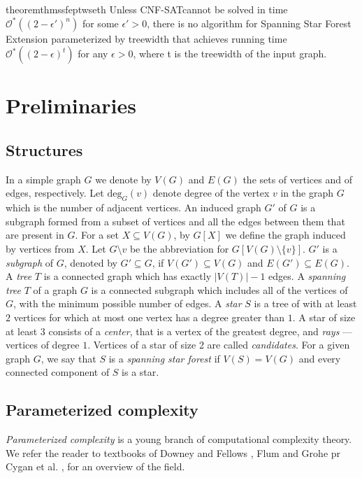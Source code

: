 \documentclass[en]{pracamgr}
\theoremstyle{definition}
\newcommand{\ssf}{spanning star forest}
\newcommand{\ssfep}{{\sc Spanning Star Forest Extension}}
\newcommand{\cnfsat}{{\sc CNF-SAT}}
\newcommand{\degree}[2]{\textrm{deg}_{#1}(#2)}
\begin{document}
\begin{restatable}{theorem}{thmssfeptwseth}\label{thm-ssfep-tw-seth}
	Unless \cnfsat cannot be solved in time $\mathcal{O}^*((2-\epsilon')^n)$ for some $\epsilon' > 0$, there is no algorithm for \ssfep{} parameterized by treewidth that achieves running time $\mathcal{O}^*((2-\epsilon)^{t})$ for any $\epsilon > 0$, where \textup{\textrm{t}} is the treewidth of the input graph.
\end{restatable}

\chapter{Preliminaries}\label{sec2}

\section{Structures}

In a simple graph $G$ we denote by $V(G)$ and $E(G)$ the sets of vertices and of edges, respectively. 
Let $\degree{G}{v}$ denote degree of the vertex $v$ in the graph $G$ which is the number of adjacent vertices. 
An induced graph $G'$ of $G$ is a subgraph formed from a subset of vertices and all the edges between them that are present in $G$. 
For a set $X \subseteq V(G)$, by $G[X]$ we define the graph induced by vertices from $X$. 
Let $G \setminus v$ be the abbreviation for $G[V(G) \setminus \{v\}]$.
$G'$ is a \emph{subgraph} of $G$, denoted by $G' \subseteq G$, if $V(G') \subseteq V(G)$ and $E(G') \subseteq E(G)$.
A \emph{tree} $T$ is a connected graph which has exactly $|V(T)|-1$ edges. 
A \emph{spanning tree} $T$ of a graph $G$ is a connected subgraph which includes all of the vertices of $G$, with the minimum possible number of edges.
A \emph{star} $S$ is a tree of with at least $2$ vertices for which at most one vertex has a degree greater than $1$. 
A star of size at least $3$ consists of a \emph{center}, that is a vertex of the greatest degree, and \emph{rays} --- vertices of degree $1$. 
Vertices of a star of size 2 are called \emph{candidates}.
For a given graph $G$, we say that $S$ is a \emph{\ssf{}} if $V(S)=V(G)$ and every connected component of $S$ is a star.

\section{Parameterized complexity}

\emph{Parameterized complexity} is a young branch of computational complexity theory. We refer the reader to textbooks of Downey and Fellows \cite{ParComp}, Flum and Grohe \cite{ParCompThm} pr Cygan et al. \cite{ParAlg}, for an overview of the field.
\end{document}
